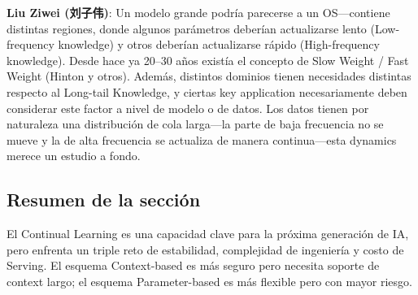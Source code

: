 \textbf{Liu Ziwei (刘子伟)}: Un modelo grande podría parecerse a un OS—contiene distintas regiones, donde algunos parámetros deberían actualizarse lento (Low-frequency knowledge) y otros deberían actualizarse rápido (High-frequency knowledge). Desde hace ya 20--30 años existía el concepto de Slow Weight / Fast Weight (Hinton y otros). Además, distintos dominios tienen necesidades distintas respecto al Long-tail Knowledge, y ciertas key application necesariamente deben considerar este factor a nivel de modelo o de datos. Los datos tienen por naturaleza una distribución de cola larga—la parte de baja frecuencia no se mueve y la de alta frecuencia se actualiza de manera continua—esta dynamics merece un estudio a fondo.

\subsection{Resumen de la sección}
El Continual Learning es una capacidad clave para la próxima generación de IA, pero enfrenta un triple reto de estabilidad, complejidad de ingeniería y costo de Serving. El esquema Context-based es más seguro pero necesita soporte de context largo; el esquema Parameter-based es más flexible pero con mayor riesgo.


